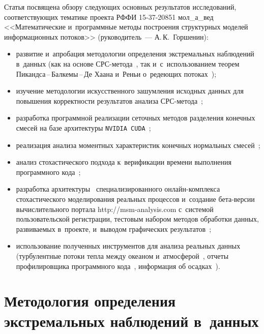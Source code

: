 \begin{multicols}{2}
Статья посвящена обзору следующих основных результатов исследований, 
соответствующих тематике проекта РФФИ 15-37-20851 мол\_а\_вед 
<<Математические и~программные методы построения структурных моделей 
информационных потоков>> (руководитель~--- А.\,К.~Горшенин):
\begin{itemize}
\item развитие и~апробация методологии определения экстремальных наблюдений в~данных 
(как на основе СРС-ме\-то\-да~\cite{Gorshenin2015Ocean}, так и~с~использованием теорем 
Пи\-канд\-са\,--\,Бал\-ке\-мы\,--\,Де Ха\-ана и~Реньи 
о~редеющих потоках~\cite{Gorshenin2016CCIS1});
\item изучение методологии искусственного зашумления исходных данных 
для повышения корректности результатов анализа СРС-ме\-то\-да~\cite{Gorshenin2016CCIS2};
\item разработка программной реализации сеточных методов разделения конечных 
смесей на базе архитектуры \verb"NVIDIA CUDA"~\cite{Gorshenin2016CUDA};
\item реализация анализа моментных характеристик конечных нормальных 
смесей~\cite{Gorshenin2016Concept};
\item анализ стохастического подхода к~верификации времени выполнения 
программного кода~\cite{Gorshenin2016ICNAAM2};
\item разработка архитектуры~\cite{Gorshenin2015ICUMT2} специализированного 
он\-лайн-комп\-лек\-са стохастического моделирования реальных процессов и~создание 
бе\-та-вер\-сии вычислительного портала {\sf http://msm-analysis.com} с~сис\-те\-мой 
пользовательской регистрации, тестовым набором методов обработки данных, 
развиваемых в~проекте, и~выводом графических результатов~\cite{Gorshenin2016ICNAAM1};
\item использование полученных инструментов для анализа реальных 
данных (турбулентные потоки тепла между океаном и~атмосферой~\cite{Gorshenin2015CCIS}, 
отчеты профилировщика программного кода~\cite{Gorshenin2016ICNAAM2}, информация 
об осадках~\cite{Gorshenin2016Soft3,Gorshenin2016Soft4}).
\end{itemize}

\section{Методология определения экстремальных наблюдений в~данных}


\end{multicols}
